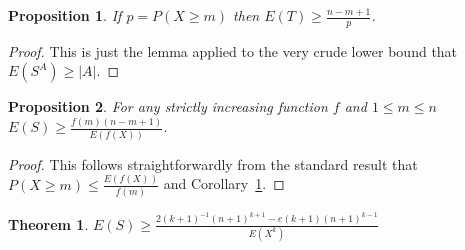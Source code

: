 \documentclass[a4paper]{book}
\newtheorem{proposition}{Proposition}
\newtheorem{theorem}{Theorem}
\begin{document}
\begin{proposition}\label{prop:coupontail}
If \(p = P(X \geq m)\) then \(E(T) \geq \frac{n - m + 1}{p}\).
\end{proposition}

\begin{proof}
This is just the lemma applied to the very crude lower bound that \(E(S^A) \geq |A|\).
\end{proof}

\begin{proposition}\label{prop:couponestimate}
For any strictly increasing function \(f\) and \(1 \leq m \leq n\)
\(E(S) \geq \frac{f(m) (n - m + 1)}{E(f(X))}\).
\end{proposition}

\begin{proof}
This follows straightforwardly from the standard result that \(P(X \geq m) \leq \frac{E(f(X))}{f(m)}\) and Corollary~\ref{prop:coupontail}.
\end{proof}

\begin{theorem}
\(E(S) \geq \frac{2 {(k + 1)}^{-1} {(n + 1)}^{k + 1} - e (k + 1) {(n + 1)}^{k - 1}}{E(X^k)}\)
\end{theorem}
\end{document}
